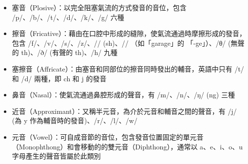 \begin{itemize}
    \item 塞音（Plosive）：以完全阻塞氣流的方式發音的音位，包含 /p/、/b/、/t/、/d/、/k/、/g/ 六種
    \item 擦音（Fricative）：藉由在口腔中形成的縫隙，使氣流通過時摩擦形成的發音，包含 /f/、/v/、/s/、/z/、/\textesh/ (sh)、/\textyogh/ （如「garage」的 「-ge」）、/θ/ (無聲的 th)、/ð/ (有聲的 th)、/h/ 九種
    \item 塞擦音（Affricate）：由塞音和同部位的擦音同時發出的輔音，英語中只有 /t\textesh/ 和 /d\textyogh/ 兩種，即 ch 和 j 的發音
    \item 鼻音（Nasal）：使氣流通過鼻腔形成的聲音，有 /m/、/n/、/ŋ/ (ng) 三種
    \item 近音（Approximant）：又稱半元音，為介於元音和輔音之間的聲音，有 /j/ (為 y 作為輔音時的發音)、/r/、/l/、/w/
    \item 元音（Vowel）：可自成音節的音位，包含發音位置固定的單元音（Monophthong）和會移動的的雙元音（Diphthong），通常以 a、e、i、o、u 字母產生的聲音皆屬於此類別
\end{itemize}











